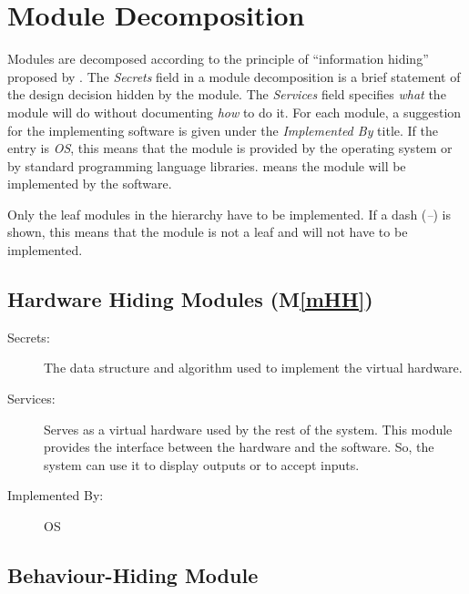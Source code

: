 \documentclass[12pt, titlepage]{article}
\newcommand{\mref}[1]{M\ref{#1}}
\begin{document}

\section{Module Decomposition} \label{SecMD}

Modules are decomposed according to the principle of ``information hiding''
proposed by \citet{ParnasEtAl1984}. The \emph{Secrets} field in a module
decomposition is a brief statement of the design decision hidden by the
module. The \emph{Services} field specifies \emph{what} the module will do
without documenting \emph{how} to do it. For each module, a suggestion for the
implementing software is given under the \emph{Implemented By} title. If the
entry is \emph{OS}, this means that the module is provided by the operating
system or by standard programming language libraries.  \emph{\progname{}} means the
module will be implemented by the \progname{} software.

Only the leaf modules in the hierarchy have to be implemented. If a dash
(\emph{--}) is shown, this means that the module is not a leaf and will not have
to be implemented.

\subsection{Hardware Hiding Modules (\mref{mHH})}

\begin{description}
\item[Secrets:] The data structure and algorithm used to implement the virtual
  hardware.
\item[Services:] Serves as a virtual hardware used by the rest of the
  system. This module provides the interface between the hardware and the
  software. So, the system can use it to display outputs or to accept inputs.
\item[Implemented By:] OS
\end{description}

\subsection{Behaviour-Hiding Module}
\end{document}
